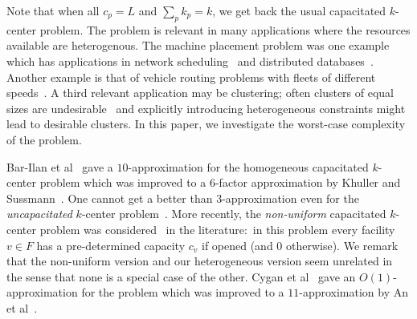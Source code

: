 \noindent
Note that when all $c_p = L$ and $\sum_p k_p = k$, we get back the usual capacitated $k$-center problem.
The \mckc problem is relevant in many applications where the resources available are heterogenous. The machine placement problem was one example which has applications in network scheduling~\cite{QiuSZ15, ImM15a} and distributed databases~\cite{MorganL77,SKRN15}. Another example is that of  vehicle routing problems with  fleets of different speeds~\cite{GortzMN016}. A third relevant application may be clustering; often clusters of equal sizes are undesirable~\cite{GuhaRS01} and explicitly introducing heterogeneous constraints might lead to desirable clusters.
In this paper, we investigate the worst-case complexity of the \mckc problem. %

Bar-Ilan et al~\cite{Bar-IlanKP93} gave a $10$-approximation for the homogeneous capacitated $k$-center problem which was improved to a $6$-factor approximation by Khuller and Sussmann~\cite{KhullerS00}. One cannot get a better than $3$-approximation even for the {\em uncapacitated} $k$-center problem~\cite{HochbaumS85}. More recently, the {\em non-uniform} capacitated $k$-center problem was considered~\cite{CyganHK12, AnBCGMS14} in the literature:~in this problem every facility $v\in F$ has a pre-determined capacity $c_v$ if opened (and $0$ otherwise). We remark that the non-uniform version and our heterogeneous version seem unrelated in the sense that none is a special case of the other.
Cygan et al~\cite{CyganHK12} gave an $O(1)$-approximation for the problem which was improved to a $11$-approximation by An et al~\cite{AnBCGMS14}.




%
%
%
